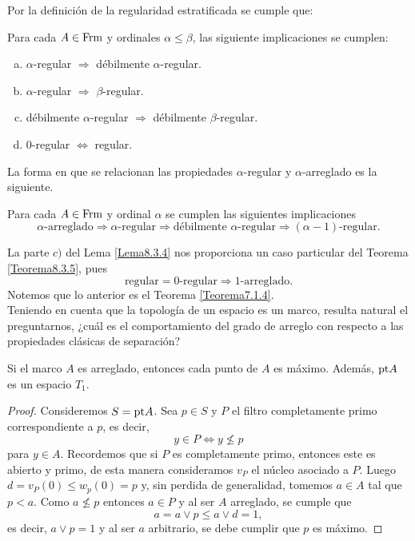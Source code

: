 Por la definición de la regularidad estratificada se cumple que:

\begin{lem}\label{Lema8.3.4}
    Para cada $A\in \mathrm{Frm}$ y ordinales $\alpha\leq \beta$, las siguiente implicaciones se cumplen:
    \begin{enumerate}[a)]
        \item $\alpha$-regular $\Rightarrow$ débilmente $\alpha$-regular.
        \item $\alpha$-regular $\Rightarrow$ $\beta$-regular.
        \item débilmente $\alpha$-regular $\Rightarrow$ débilmente $\beta$-regular.
        \item $0$-regular $\Leftrightarrow$ regular.
    \end{enumerate}
\end{lem}

La forma en que se relacionan las propiedades $\alpha$-regular y $\alpha$-arreglado es la siguiente.

\begin{thm}\label{Teorema8.3.5}
    Para cada $A\in \mathrm{Frm}$ y ordinal $\alpha$ se cumplen las siguientes implicaciones
    \[
    \alpha\mbox{-arreglado}\Rightarrow \alpha\mbox{-regular}\Rightarrow \mbox{débilmente }\alpha\mbox{-regular}\Rightarrow (\alpha-1)\mbox{-regular}.
    \]
\end{thm}

La parte $c)$ del Lema \ref{Lema8.3.4} nos proporciona un caso particular del Teorema \ref{Teorema8.3.5}, pues 
\[
\mbox{regular}=0\mbox{-regular}\Rightarrow 1\mbox{-arreglado}. 
\]
Notemos que lo anterior es el Teorema \ref{Teorema7.1.4}.\\

Teniendo en cuenta que la topología de un espacio es un marco, resulta natural el preguntarnos, ¿cuál es el comportamiento del grado de arreglo con respecto a las propiedades clásicas de separación?

\begin{lem}\label{Lema8.4.1}
    Si el marco $A$ es arreglado, entonces cada punto de $A$ es máximo. Además, $\mathrm{pt} A$ es un espacio $T_1$.
\end{lem}

\begin{proof}
    Consideremos $S=\mathrm{pt} A$. Sea $p\in S$ y $P$ el filtro completamente primo correspondiente a $p$, es decir, 
    \[
    y\in P\Leftrightarrow y\nleq p
    \]
    para $y\in A$. Recordemos que si $P$ es completamente primo, entonces este es abierto y primo, de esta manera consideramos $v_P$ el núcleo asociado a $P$. Luego $d=v_P(0)\leq w_p(0)=p$ y, sin perdida de generalidad, tomemos $a\in A$ tal que $p< a$. Como $a\nleq p$ entonces $a\in P$ y al ser $A$ arreglado, se cumple que 
    \[
    a=a\vee p\leq a\vee d=1,
    \]
    es decir, $a\vee p=1$ y al ser $a$ arbitrario, se debe cumplir que $p$ es máximo.
\end{proof}

